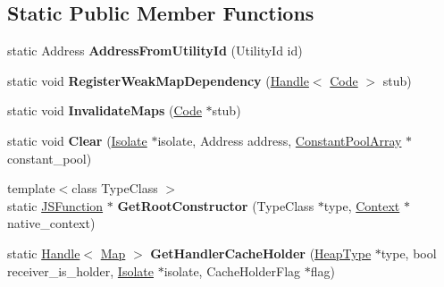 \subsection*{Static Public Member Functions}
\begin{DoxyCompactItemize}
\item 
\hypertarget{classv8_1_1internal_1_1_i_c_a273017ed6884cdb1a736eb2a6c10a1e3}{}static Address {\bfseries Address\+From\+Utility\+Id} (Utility\+Id id)\label{classv8_1_1internal_1_1_i_c_a273017ed6884cdb1a736eb2a6c10a1e3}

\item 
\hypertarget{classv8_1_1internal_1_1_i_c_af0419e658b7f37e934578d83b9eafc3d}{}static void {\bfseries Register\+Weak\+Map\+Dependency} (\hyperlink{classv8_1_1internal_1_1_handle}{Handle}$<$ \hyperlink{classv8_1_1internal_1_1_code}{Code} $>$ stub)\label{classv8_1_1internal_1_1_i_c_af0419e658b7f37e934578d83b9eafc3d}

\item 
\hypertarget{classv8_1_1internal_1_1_i_c_afd601c1fc11f3b3f3f2dbca75377541a}{}static void {\bfseries Invalidate\+Maps} (\hyperlink{classv8_1_1internal_1_1_code}{Code} $\ast$stub)\label{classv8_1_1internal_1_1_i_c_afd601c1fc11f3b3f3f2dbca75377541a}

\item 
\hypertarget{classv8_1_1internal_1_1_i_c_a906522699853265312851301e75e5f3f}{}static void {\bfseries Clear} (\hyperlink{classv8_1_1internal_1_1_isolate}{Isolate} $\ast$isolate, Address address, \hyperlink{classv8_1_1internal_1_1_constant_pool_array}{Constant\+Pool\+Array} $\ast$constant\+\_\+pool)\label{classv8_1_1internal_1_1_i_c_a906522699853265312851301e75e5f3f}

\item 
\hypertarget{classv8_1_1internal_1_1_i_c_aa603f647d1d6918af8ac64dcd01d11af}{}{\footnotesize template$<$class Type\+Class $>$ }\\static \hyperlink{classv8_1_1internal_1_1_j_s_function}{J\+S\+Function} $\ast$ {\bfseries Get\+Root\+Constructor} (Type\+Class $\ast$type, \hyperlink{classv8_1_1internal_1_1_context}{Context} $\ast$native\+\_\+context)\label{classv8_1_1internal_1_1_i_c_aa603f647d1d6918af8ac64dcd01d11af}

\item 
\hypertarget{classv8_1_1internal_1_1_i_c_ae3e49af07c1ec1c98adc711cb587a57f}{}static \hyperlink{classv8_1_1internal_1_1_handle}{Handle}$<$ \hyperlink{classv8_1_1internal_1_1_map}{Map} $>$ {\bfseries Get\+Handler\+Cache\+Holder} (\hyperlink{classv8_1_1internal_1_1_type_impl}{Heap\+Type} $\ast$type, bool receiver\+\_\+is\+\_\+holder, \hyperlink{classv8_1_1internal_1_1_isolate}{Isolate} $\ast$isolate, Cache\+Holder\+Flag $\ast$flag)\label{classv8_1_1internal_1_1_i_c_ae3e49af07c1ec1c98adc711cb587a57f}


\end{DoxyCompactItemize}
